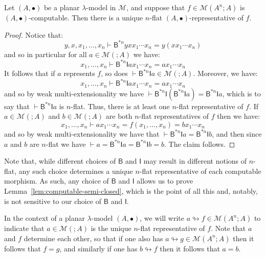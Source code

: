 \documentclass{llncs}
\begin{document}
\begin{lemma}\label{def:unique-flat-representative}
  Let $(A,\bullet)$ be a planar $\lambda$-model in $\mathcal{M}$, and suppose that $f \in \mathcal{M}(A^n;A)$ is $(A,\bullet)$-computable. Then there is a unique $n$-flat $(A,\bullet)$-representative of $f$.
\end{lemma}
\begin{proof}
  Notice that:
  \[
    y,x,x_1,\ldots,x_n \vdash \mathsf{B}^{*n}yxx_1 \cdots x_n = y(xx_1 \cdots x_n)
  \]
  and so in particular for all $a \in \mathcal{M}(;A)$ we have:
  \[
    x_1,\ldots,x_n \vdash \mathsf{B}^{*n}\mathsf{I}ax_1 \cdots x_n = ax_1 \cdots x_n
  \]
  It follows that if $a$ represents $f$, so does $\vdash\mathsf{B}^{*n}\mathsf{I}a \in \mathcal{M}(;A)$. Moreover, we have:
  \[
    x_1,\ldots,x_n \vdash \mathsf{B}^{*n}\mathsf{I}ax_1\cdots x_n = ax_1\cdots x_n
  \]
  and so by weak multi-extensionality we have $\vdash \mathsf{B}^{*n}\mathsf{I}(\mathsf{B}^{*n}\mathsf{I}a) = \mathsf{B}^{*n}\mathsf{I}a$, which is to say that $\vdash \mathsf{B}^{*n}\mathsf{I}a$ is $n$-flat. Thus, there is at least one $n$-flat representative of $f$. If $a \in \mathcal{M}(;A)$ and $b \in \mathcal{M}(;A)$ are both $n$-flat representatives of $f$ then we have:
  \[
    x_1,\ldots,x_n \vdash ax_1\cdots x_n = f(x_1,\ldots,x_n) = bx_1\cdots x_n
  \]
  and so by weak multi-extensionality we have that $\vdash \mathsf{B}^{*n}\mathsf{I}a = \mathsf{B}^{*n}\mathsf{I} b$, and then since $a$ and $b$ are $n$-flat we have $\vdash a = \mathsf{B}^{*n}\mathsf{I}a = \mathsf{B}^{*n}\mathsf{I}b = b$. The claim follows.
\end{proof}
Note that, while different choices of $\mathsf{B}$ and $\mathsf{I}$ may result in different notions of $n$-flat, any such choice determines a unique $n$-flat representative of each computable morphism. As such, any choice of $\mathsf{B}$ and $\mathsf{I}$ allows us to prove Lemma~\ref{lem:computable-semi-closed}, which is the point of all this and, notably, is not sensitive to our choice of $\mathsf{B}$ and $\mathsf{I}$.

In the context of a planar $\lambda$-model $(A,\bullet)$, we will write $a \looparrowright f \in \mathcal{M}(A^n;A)$ to indicate that $a \in \mathcal{M}(;A)$ is the unique $n$-flat representative of $f$. Note that $a$ and $f$ determine each other, so that if one also has $a \looparrowright g \in \mathcal{M}(A^n;A)$ then it follows that $f = g$, and similarly if one has $b \looparrowright f$ then it follows that $a = b$.
\end{document}
